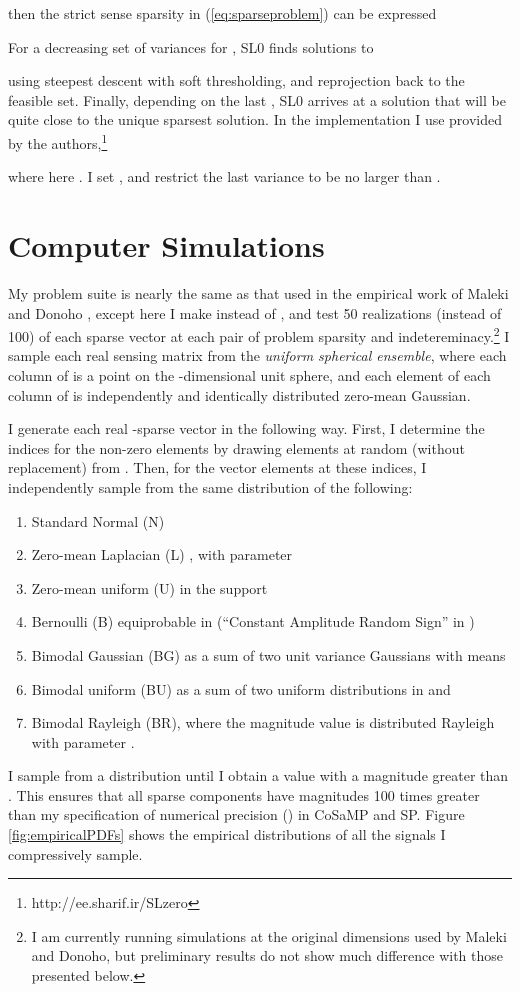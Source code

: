 \documentclass[11pt,draftcls,onecolumn]{IEEEtran}
\begin{document}
then the strict sense sparsity in (\ref{eq:sparseproblem}) can be expressed

For a decreasing set of variances 
for , SL0 finds solutions to

using steepest descent with soft thresholding,
and reprojection back to the feasible set.
Finally, depending on the last , 
SL0 arrives at a solution that will be quite close to the unique sparsest solution.
In the implementation I use provided by the authors,\footnote{http://ee.sharif.ir/SLzero}

where here .
I set , and restrict the last variance to be no larger than .

\section{Computer Simulations}
My problem suite is nearly the same as that used 
in the empirical work of Maleki and Donoho \cite{Maleki2010},
except here I make  instead of ,
and test 50 realizations (instead of 100) of each sparse vector
at each pair of problem sparsity and indetereminacy.\footnote{I am currently
running simulations at the original dimensions used by
Maleki and Donoho, but preliminary results do not show much
difference with those presented below.}
I sample each real sensing matrix from the {\em uniform spherical ensemble},
where each column of  is a point on the -dimensional unit sphere,
and each element of each column of  is 
independently and identically distributed zero-mean Gaussian.

I generate each real -sparse vector in the following way.
First, I determine the indices for the non-zero elements by drawing 
 elements at random (without replacement) from .
Then, for the vector elements at these indices,
I independently sample from the same distribution of the following:
\begin{enumerate}
\item Standard Normal (N)
\item Zero-mean Laplacian (L) , with parameter 
\item Zero-mean uniform (U) in the support 
\item Bernoulli (B) equiprobable in  (``Constant Amplitude Random Sign'' in \cite{Maleki2010})
\item Bimodal Gaussian (BG) as a sum of two unit variance Gaussians with means 
\item Bimodal uniform (BU) as a sum of two uniform distributions in  and 
\item Bimodal Rayleigh (BR), where the magnitude value is distributed Rayleigh with parameter .
\end{enumerate}
I sample from a distribution until I obtain a value with a magnitude greater than .
This ensures that all sparse components have magnitudes 100 times greater
than my specification of numerical precision () in CoSaMP and SP.
Figure \ref{fig:empiricalPDFs} shows the empirical distributions 
of all the signals I compressively sample.
\end{document}
